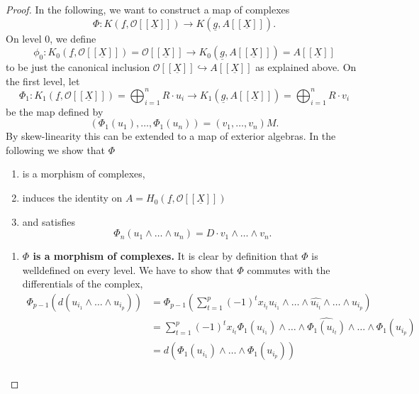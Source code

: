 \documentclass{article}
\theoremstyle{plain}%
\theoremstyle{definition}
\theoremstyle{remark}
\begin{document}
\begin{proof}
    In the following, we want to construct a map of complexes
    \[\Phi\colon K(\underline{f}, \mathcal{O}[[\underline{X}]]) \to K(\underline{g}, A[[\underline{X}]]).\]
    On level 0, we define 
    \[
        \phi_0 \colon K_0(\underline{f}, \mathcal{O}[[\underline{X}]]) = \mathcal{O}[[\underline{X}]] 
        \to 
        K_0(\underline{g}, A[[\underline{X}]]) = A[[\underline{X}]]
    \]
    to be just the canonical inclusion \(\mathcal{O}[[\underline{X}]] \hookrightarrow A[[\underline{X}]]\)
    as explained above.
    On the first level, let
    \[
        \Phi_1 \colon 
            K_1(\underline{f}, \mathcal{O}[[\underline{X}]]) = \bigoplus_{i = 1}^n R \cdot u_i
            \to 
            K_1(\underline{g}, A[[\underline{X}]]) = \bigoplus_{i=1}^n R \cdot v_i
    \]
    be the map defined by
    \[
        (\Phi_1(u_1), \dots, \Phi_1(u_n)) = (v_1, \dots, v_n)M. %
    \]
    By skew-linearity this can be extended to a map of exterior algebras. %
    In the following we show that \(\Phi\)
    \begin{enumerate}
        \item is a morphism of complexes,
        \item induces the identity on \(A = H_0(\underline{f}, \mathcal{O}[[\underline{X}]])\)
        \item and satisfies
        \[
            \Phi_n(u_1 \wedge \dots \wedge u_n) = D \cdot v_1 \wedge \dots \wedge v_n.  
        \]
    \end{enumerate}
    \begin{enumerate}
        \item \textbf{\(\Phi\) is a morphism of complexes.}
        It is clear by definition that \(\Phi\) is welldefined on every level.
        We have to show that \(\Phi\) commutes with the differentials of the complex,
        \begin{align*}
            \Phi_{p-1}(d(u_{i_1}\!\wedge\!\dots\!\wedge\!u_{i_p})) 
            &= \Phi_{p-1}\left(\sum_{t=1}^p(-1)^t x_{i_t} 
            u_{i_1}\!\wedge\!\dots\!\wedge\!\widehat{u_{i_t}}\!\wedge\!\dots\!\wedge\!u_{i_p}\right)\\
            &= \sum_{t=1}^p(-1)^t x_{i_t}\Phi_1(u_{i_1})\!\wedge\!\dots\!
            \wedge\widehat{\Phi_1(u_{i_t})}\!\wedge\!\dots\!\wedge\!\Phi_1(u_{i_p})\\
            &= d(\Phi_1(u_{i_1})\wedge\dots\wedge \Phi_1(u_{i_p}))\\

\end{align*}
\end{enumerate}
\end{proof}
\end{document}
